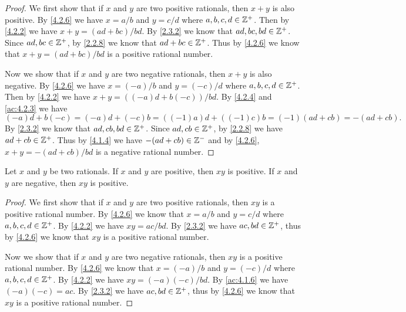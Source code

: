 \begin{proof}
  We first show that if \(x\) and \(y\) are two positive rationals, then \(x + y\) is also positive.
  By \cref{4.2.6} we have \(x = a / b\) and \(y = c / d\) where \(a, b, c, d \in \mathbb{Z}^+\).
  Then by \cref{4.2.2} we have \(x + y = (ad + bc) / bd\).
  By \cref{2.3.2} we know that \(ad, bc, bd \in \mathbb{Z}^+\).
  Since \(ad, bc \in \mathbb{Z}^+\), by \cref{2.2.8} we know that \(ad + bc \in \mathbb{Z}^+\).
  Thus by \cref{4.2.6} we know that \(x + y = (ad + bc) / bd\) is a positive rational number.

  Now we show that if \(x\) and \(y\) are two negative rationals, then \(x + y\) is also negative.
  By \cref{4.2.6} we have \(x = (-a) / b\) and \(y = (-c) / d\) where \(a, b, c, d \in \mathbb{Z}^+\).
  Then by \cref{4.2.2} we have \(x + y = ((-a)d + b(-c)) / bd\).
  By \cref{4.2.4} and \cref{ac:4.2.3} we have
  \[
    (-a)d + b(-c) = (-a)d + (-c)b = ((-1)a)d + ((-1)c)b = (-1)(ad + cb) = -(ad + cb).
  \]
  By \cref{2.3.2} we know that \(ad, cb, bd \in \mathbb{Z}^+\).
  Since \(ad, cb \in \mathbb{Z}^+\), by \cref{2.2.8} we have \(ad + cb \in \mathbb{Z}^+\).
  Thus by \cref{4.1.4} we have \(-(ad + cb) \in \mathbb{Z}^-\) and by \cref{4.2.6}, \(x + y = -(ad + cb) / bd\) is a negative rational number.
\end{proof}

\begin{ac}\label{ac:4.2.5}
  Let \(x\) and \(y\) be two rationals.
  If \(x\) and \(y\) are positive, then \(xy\) is positive.
  If \(x\) and \(y\) are negative, then \(xy\) is positive.
\end{ac}

\begin{proof}
  We first show that if \(x\) and \(y\) are two positive rationals, then \(xy\) is a positive rational number.
  By \cref{4.2.6} we know that \(x = a / b\) and \(y = c / d\) where \(a, b, c, d \in \mathbb{Z}^+\).
  By \cref{4.2.2} we have \(xy = ac / bd\).
  By \cref{2.3.2} we have \(ac, bd \in \mathbb{Z}^+\), thus by \cref{4.2.6} we know that \(xy\) is a positive rational number.

  Now we show that if \(x\) and \(y\) are two negative rationals, then \(xy\) is a positive rational number.
  By \cref{4.2.6} we know that \(x = (-a) / b\) and \(y = (-c) / d\) where \(a, b, c, d \in \mathbb{Z}^+\).
  By \cref{4.2.2} we have \(xy = (-a)(-c) / bd\).
  By \cref{ac:4.1.6} we have \((-a)(-c) = ac\).
  By \cref{2.3.2} we have \(ac, bd \in \mathbb{Z}^+\), thus by \cref{4.2.6} we know that \(xy\) is a positive rational number.
\end{proof}

